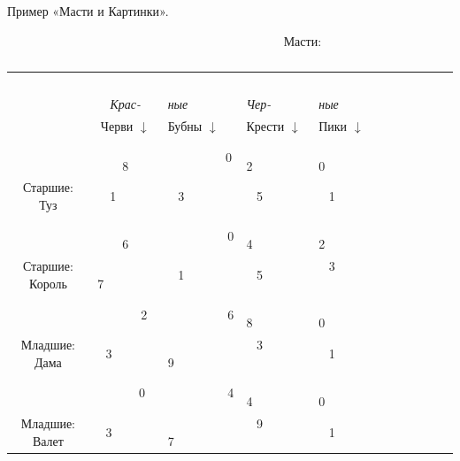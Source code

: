 \begin{problem}
 Пример «Масти и Картинки».
 \begin{table}[hbt]  \caption{}
~~~~~~~~~~~~~~~~~~~~~~~~~~~~~~~~~~~~~~~~~~~~ Масти:  \\
{\begin{tabular}{cc|l|l|l|l}
               &      &             &~~~          &    &     \\
               &     {\em Крас- }      &  {\em ные }      &  {\em Чер-}     &  {\em ные }  &      \\
\cline{2-5}%
               & Черви $\downarrow$ &   Бубны $\downarrow$ & Крести $\downarrow$ &     Пики $
\downarrow$ &            \\
\cline{2-5}%
             ~~~   &~~~ ~~~~~ 8 &~~~ ~~~~~ 0 &~~~~~~~~~  2 &~~~~~~~~~  0 &~~~~~~~~~   \\
   Старшие: Туз &~  1~~~ ~~&~ 3~~~ ~~ &~ 5         ~&~ 1        ~&~         \\
\cline{2-5}%
                 &~~~ ~~~~~ 6&~~~~~~~~~ 0  &~~~~~~~~~  4 &~~~~~~~~~  2 &~~~~~~~~~   \\
   Старшие: Король &~ 7~~~~~~~~&~ 1~~~~~~~~  &~ 5~~~~ ~~ &~ 3~ ~~~~~~ &~  ~ \\
\cline{2-5}%
                 &~ ~~ ~~ 2~&~~~~~~~~~ 6  &~~~~~~~~~  8 &~~~~~~~~~  0 &~~~~~~~~~   \\
   Младшие:  Дама &~ 3~~~~~~~&~ 9~~~~~~~~~ &~  3~~~~~ ~~ &~ 1~~~~~~~ &~  ~~~~~ \\
\cline{2-5}%
\cline{2-5}%
                  &~ ~~~ ~0~&~~~~~~~~~ 4  &~~~~~~~~~ 4 &~~~~~~~~~ 0  &~~~~~~~~~   \\
 Младшие:  Валет  &~ 3~~~~~~~&~ 7~~~~~~~~~ &~ 9~~~~~ ~~ &~ 1~~~~~~~ &~  ~~~~~~~ \\
\cline{2-5}%
\end{tabular}}\label{cards}
\end{table}


\end{problem}
